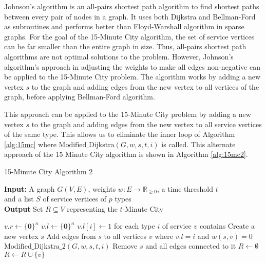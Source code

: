 Johnson's algorithm is an all-pairs shortest path algorithm to find shortest paths between every pair of nodes in a graph. It uses both Dijkstra and Bellman-Ford as subroutines and performs better than Floyd-Warshall algorithm in sparse graphs. For the goal of the 15-Minute City algorithm, the set of service vertices can be far smaller than the entire graph in size. Thus, all-pairs shortest path algorithms are not optimal solutions to the problem. However, Johnson's algorithm's approach in adjusting the weights to make all edges non-negative can be applied to the 15-Minute City problem. The algorithm works by adding a new vertex $s$ to the graph and adding edges from the new vertex to all vertices of the graph, before applying Bellman-Ford algorithm.

This approach can be applied to the 15-Minute City problem by adding a new vertex $s$ to the graph and adding edges from the new vertex to all service vertices of the same type. This allows us to eliminate the inner loop of Algorithm \ref{alg:15mc} where $\text{Modified\_Dijkstra}(G, w, s, t, i)$ is called. This alternate approach of the 15 Minute City algorithm is shown in Algorithm \ref{alg:15mc2}.

\begin{algorithm}[H]
    \caption{15-Minute City Algorithm 2} \label{alg:15mc2}
    \textbf{Input:} A graph $G(V,E)$, weights $w:E\rightarrow\mathbb{R}_{\geq 0}$, a time threshold $t$ \\  and a list $S$ of service vertices of $p$ types\\
    \textbf{Output} Set $R\subseteq V$ representing the $t$-Minute City
    \begin{algorithmic}
            \State $v.r \gets \{\mathbf{0}\}^{n}$
            \State $v.l \gets \{\mathbf{0}\}^{n}$
        \EndFor
            \State $v.l[i] \gets 1$ for each type $i$ of service $v$ contains
        \EndFor
            \State Create a new vertex $s$
            \State Add edges from $s$ to all vertices $v$ where $v.l=i$ and $w(s,v)=0$
            \State $\text{Modified\_Dijkstra\_2}(G,w,s,t,i)$
            \State Remove $s$ and all edges connected to it
        \EndFor
        \State $R\gets\emptyset$
                \State $R \gets R\cup \{v\}$
            \EndIf
        \EndFor
    \end{algorithmic}
\end{algorithm}

